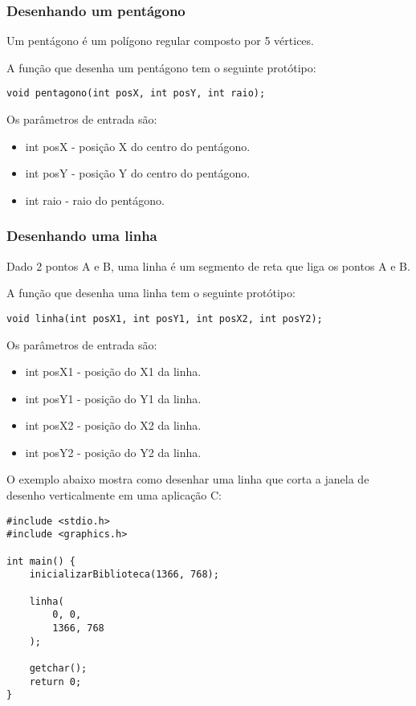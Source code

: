 \documentclass[12pt, %
openright,
oneside, %
a4paper,    %
brazil]{facom-ufu-abntex2}
\begin{document}
\subsubsection{Desenhando um pentágono}
Um pentágono é um polígono regular composto por 5 vértices.

A função que desenha um pentágono tem o seguinte protótipo:

\begin{verbatim}
void pentagono(int posX, int posY, int raio);
\end{verbatim}

Os parâmetros de entrada são:

\begin{itemize}
    \item int posX - posição X do centro do pentágono.
    \item int posY - posição Y do centro do pentágono.
    \item int raio - raio do pentágono.
\end{itemize}

\subsubsection{Desenhando uma linha}
Dado 2 pontos A e B, uma linha é um segmento de reta que liga os pontos A e B.

A função que desenha uma linha tem o seguinte protótipo:

\begin{verbatim}
void linha(int posX1, int posY1, int posX2, int posY2);
\end{verbatim}

Os parâmetros de entrada são:

\begin{itemize}
    \item int posX1 - posição do X1 da linha.
    \item int posY1 - posição do Y1 da linha.
    \item int posX2 - posição do X2 da linha.
    \item int posY2 - posição do Y2 da linha.
\end{itemize}

O exemplo abaixo mostra como desenhar uma linha que corta a janela de desenho verticalmente em uma aplicação C:

\begin{verbatim}
#include <stdio.h>
#include <graphics.h>

int main() {
    inicializarBiblioteca(1366, 768);

    linha(
        0, 0,
        1366, 768
    );

    getchar();
    return 0;
}
\end{verbatim}
\end{document}
